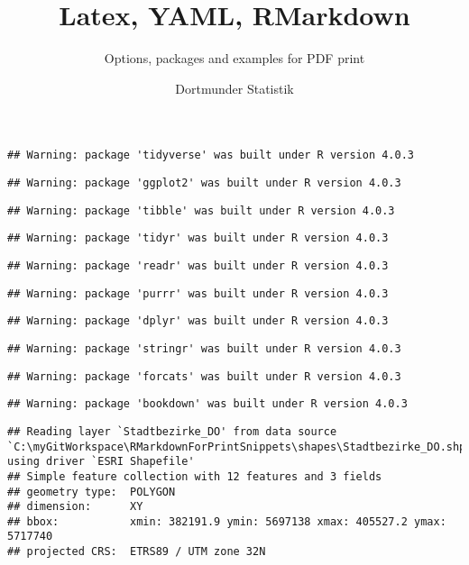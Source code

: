 \documentclass[
  a4paper,
  twoside]{article}
\title{Latex, YAML, RMarkdown}
\subtitle{Options, packages and examples for PDF print}
\author{Dortmunder Statistik}
\date{}
\begin{document}
\maketitle

{
\hypersetup{linkcolor=}
\setcounter{tocdepth}{4}
\tableofcontents
}
\begin{verbatim}
## Warning: package 'tidyverse' was built under R version 4.0.3
\end{verbatim}

\begin{verbatim}
## Warning: package 'ggplot2' was built under R version 4.0.3
\end{verbatim}

\begin{verbatim}
## Warning: package 'tibble' was built under R version 4.0.3
\end{verbatim}

\begin{verbatim}
## Warning: package 'tidyr' was built under R version 4.0.3
\end{verbatim}

\begin{verbatim}
## Warning: package 'readr' was built under R version 4.0.3
\end{verbatim}

\begin{verbatim}
## Warning: package 'purrr' was built under R version 4.0.3
\end{verbatim}

\begin{verbatim}
## Warning: package 'dplyr' was built under R version 4.0.3
\end{verbatim}

\begin{verbatim}
## Warning: package 'stringr' was built under R version 4.0.3
\end{verbatim}

\begin{verbatim}
## Warning: package 'forcats' was built under R version 4.0.3
\end{verbatim}

\begin{verbatim}
## Warning: package 'bookdown' was built under R version 4.0.3
\end{verbatim}

\begin{verbatim}
## Reading layer `Stadtbezirke_DO' from data source `C:\myGitWorkspace\RMarkdownForPrintSnippets\shapes\Stadtbezirke_DO.shp' using driver `ESRI Shapefile'
## Simple feature collection with 12 features and 3 fields
## geometry type:  POLYGON
## dimension:      XY
## bbox:           xmin: 382191.9 ymin: 5697138 xmax: 405527.2 ymax: 5717740
## projected CRS:  ETRS89 / UTM zone 32N
\end{verbatim}
\end{document}
